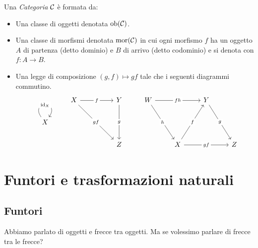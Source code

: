 \documentclass{article}
\begin{document}
\begin{definition}
    Una \emph{Categoria} $\mathcal{C}$ è formata da:
    \begin{itemize}
        \item Una classe di oggetti denotata $\operatorname{ob}(\mathcal{C})$.
        \item Una classe di morfismi denotata $\operatorname{mor}(\mathcal{C})$ in cui ogni morfismo $f$ ha un oggetto $A$ di partenza (detto dominio) e $B$ di arrivo (detto codominio) e si denota con $f:A\to B$.
        \item Una legge di composizione $(g,f)\mapsto gf$ tale che i seguenti diagrammi commutino.
        \[\begin{tikzcd}
            & X && Y & W && Y \\
            X \\
            &&& Z && X && Z
            \arrow["f"{description}, from=1-2, to=1-4]
            \arrow["gf"{description}, from=1-2, to=3-4]
            \arrow["g"{description}, from=1-4, to=3-4]
            \arrow["fh"{description}, from=1-5, to=1-7]
            \arrow["h"{description}, from=1-5, to=3-6]
            \arrow["g"{description}, from=1-7, to=3-8]
            \arrow["{\id{X}}"{description}, from=2-1, to=2-1, loop, in=55, out=125, distance=10mm]
            \arrow["f"{description}, from=3-6, to=1-7]
            \arrow["gf"{description}, from=3-6, to=3-8]
        \end{tikzcd}\]
    \end{itemize}
\end{definition}

\section{Funtori e trasformazioni naturali}
\label{Sec:Functors}

\subsection{Funtori}

Abbiamo parlato di oggetti e frecce tra oggetti. Ma se volessimo parlare di frecce tra le frecce?
\end{document}
